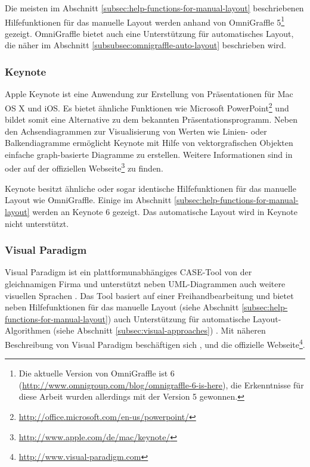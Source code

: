 Die meisten im Abschnitt \ref{subsec:help-functions-for-manual-layout} beschriebenen Hilfefunktionen für das manuelle Layout werden anhand von OmniGraffle 5\footnote{Die aktuelle Version von OmniGraffle ist 6 (\url{http://www.omnigroup.com/blog/omnigraffle-6-is-here}), die Erkenntnisse für diese Arbeit wurden allerdings mit der Version 5 gewonnen.} gezeigt. OmniGraffle bietet auch eine Unterstützung für automatisches Layout, die näher im Abschnitt \ref{subsubsec:omnigraffle-auto-layout} beschrieben wird.

\subsubsection{Keynote}
\label{subsubsec:keynote}

Apple Keynote ist eine Anwendung zur Erstellung von Präsentationen für Mac OS X und iOS. Es bietet ähnliche Funktionen wie Microsoft PowerPoint\footnote{\url{http://office.microsoft.com/en-us/powerpoint/}} und bildet somit eine Alternative zu dem bekannten Präsentationsprogramm. Neben den Achsendiagrammen zur Visualisierung von Werten wie Linien- oder Balkendiagramme ermöglicht Keynote mit Hilfe von vektorgrafischen Objekten einfache graph-basierte Diagramme zu erstellen. Weitere Informationen sind in \cite{11Keynote} oder auf der offiziellen Webseite\footnote{\url{http://www.apple.com/de/mac/keynote/}} zu finden. 

Keynote besitzt ähnliche oder sogar identische Hilfefunktionen für das manuelle Layout wie OmniGraffle. Einige im Abschnitt \ref{subsec:help-functions-for-manual-layout} werden an Keynote 6 gezeigt. Das automatische Layout wird in Keynote nicht unterstützt.

\subsubsection{Visual Paradigm}
\label{subsubsec:visual-paradigm}

Visual Paradigm ist ein plattformunabhängiges CASE-Tool von der gleichnamigen Firma und unterstützt neben UML-Diagrammen auch weitere visuellen Sprachen \cite{14Visual}. Das Tool basiert auf einer Freihandbearbeitung und bietet neben Hilfefunktionen für das manuelle Layout (siehe Abschnitt \ref{subsec:help-functions-for-manual-layout}) auch Unterstützung für automatische Layout-Algorithmen (siehe Abschnitt \ref{subsec:visual-approaches}) \cite{Fuhrmann11On-the-Pragmatics}. Mit näheren Beschreibung von Visual Paradigm beschäftigen sich \cite{14Visual}, \cite[S.313-314]{Fuhrmann11On-the-Pragmatics} und die offizielle Webseite\footnote{\url{http://www.visual-paradigm.com}}.

